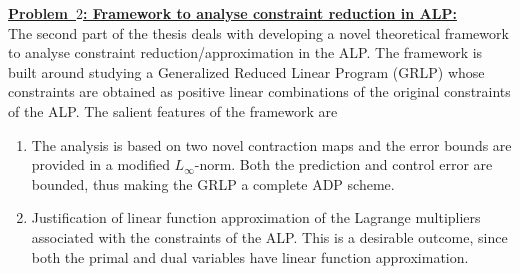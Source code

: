 \textbf{\underline{Problem~$2$: Framework to analyse constraint reduction in ALP:}}\\
The second part of the thesis deals with developing a novel theoretical framework to analyse constraint reduction/approximation in the ALP. The framework is built around studying a Generalized Reduced Linear Program (GRLP) whose constraints are obtained as positive linear combinations of the original constraints of the ALP. The salient features of the framework are
\begin{enumerate}
\item The analysis is based on two novel contraction maps and the error bounds are provided in a modified $L_\infty$-norm. Both the prediction and control error are bounded, thus making the GRLP a complete ADP scheme.
\item Justification of linear function approximation of the Lagrange multipliers associated with the constraints of the ALP. This is a desirable outcome, since both the primal and dual variables have linear function approximation.
\end{enumerate}

